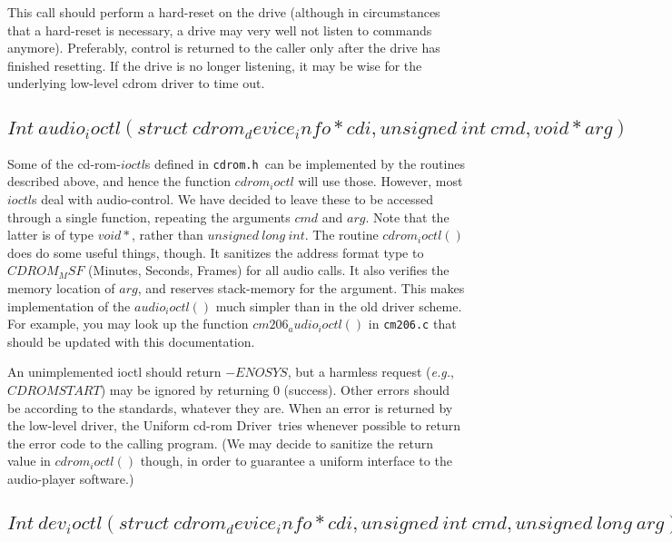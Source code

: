 \documentclass{article}
\def\cdrom{{\sc cd-rom}}
\def\UCD{{\sc Uniform cd-rom Driver}}
\def\cdromh{{\tt {cdrom.h}}}
\def\fo{\sl}                    %
\def\eg{{\fo e.g.}}
\begin{document}
This call should perform a hard-reset on the drive (although in
circumstances that a hard-reset is necessary, a drive may very well not
listen to commands anymore). Preferably, control is returned to the
caller only after the drive has finished resetting. If the drive is no
longer listening, it may be wise for the underlying low-level cdrom
driver to time out.

\subsection{$Int\ audio_ioctl(struct\ cdrom_device_info * cdi, unsigned\
  int\ cmd, void * arg)$}

Some of the \cdrom-$ioctl$s defined in \cdromh\ can be
implemented by the routines described above, and hence the function
$cdrom_ioctl$ will use those. However, most $ioctl$s deal with
audio-control. We have decided to leave these to be accessed through a
single function, repeating the arguments $cmd$ and $arg$. Note that
the latter is of type $void*{}$, rather than $unsigned\ long\
int$. The routine $cdrom_ioctl()$ does do some useful things,
though. It sanitizes the address format type to $CDROM_MSF$ (Minutes,
Seconds, Frames) for all audio calls. It also verifies the memory
location of $arg$, and reserves stack-memory for the argument. This
makes implementation of the $audio_ioctl()$ much simpler than in the
old driver scheme. For example, you may look up the function
$cm206_audio_ioctl()$ in {\tt {cm206.c}} that should be updated with
this documentation. 

An unimplemented ioctl should return $-ENOSYS$, but a harmless request
(\eg, $CDROMSTART$) may be ignored by returning 0 (success). Other
errors should be according to the standards, whatever they are. When
an error is returned by the low-level driver, the \UCD\ tries whenever
possible to return the error code to the calling program. (We may decide
to sanitize the return value in $cdrom_ioctl()$ though, in order to
guarantee a uniform interface to the audio-player software.)

\subsection{$Int\ dev_ioctl(struct\ cdrom_device_info * cdi, unsigned\ int\
  cmd, unsigned\ long\ arg)$}
\end{document}
